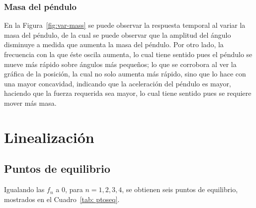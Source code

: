 \documentclass{ieeeaccess}
\begin{document}
\subsubsection{Masa del péndulo}
En la Figura~\ref{fig:var-mass} se puede observar la respuesta temporal
al variar la masa del péndulo, de la cual se puede observar que la amplitud
del ángulo disminuye a medida que aumenta la masa del péndulo. Por otro
lado, la frecuencia con la que éste oscila aumenta, lo cual tiene sentido
pues el péndulo se mueve más rápido sobre ángulos más pequeños; lo que se
corrobora al ver la gráfica de la posición, la cual no solo aumenta más
rápido, sino que lo hace con una mayor concavidad, indicando que la
aceleración del péndulo es mayor, haciendo que la fuerza requerida
sea mayor, lo cual tiene sentido pues se requiere mover más masa.


\section{Linealización}
\subsection{Puntos de equilibrio}
Igualando las $f_n$ a 0, para $n=1,2,3,4$, se obtienen seis puntos de
equilibrio, mostrados en el Cuadro~\ref{tab: ptoseq}.
\end{document}
